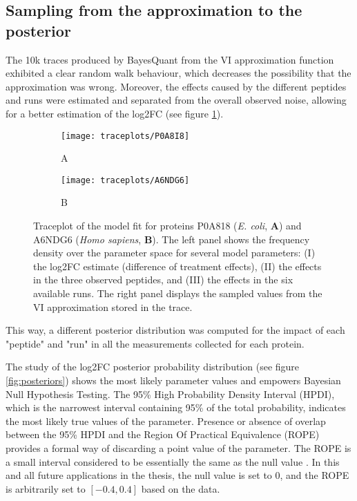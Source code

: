 \subsection{Sampling from the approximation to the posterior}
\label{subsec:basic_model}


The 10k traces produced by BayesQuant from the \ac{VI} approximation function exhibited a clear random walk behaviour, which decreases the possibility that the approximation was wrong. Moreover, the  effects caused by the different peptides and runs were estimated and separated from the overall observed noise, allowing for a better estimation of the \ac{log2FC} (see figure \ref{fig:traceplots}).

\begin{figure}[!h]
\begin{subfigure}{\textwidth}
\centering
\caption*{A}
\texttt{[image: traceplots/P0A8I8]}
\end{subfigure}
\bigskip
\begin{subfigure}{\textwidth}
\centering
\caption*{B}
\texttt{[image: traceplots/A6NDG6]}
\end{subfigure}
\caption[Traceplots for 2 proteins]{Traceplot of the model fit for proteins P0A818 (\textit{E. coli}, \textbf{A}) and A6NDG6 (\textit{Homo sapiens}, \textbf{B}). The left panel shows the frequency density over the parameter space for several model parameters: (I) the \ac{log2FC} estimate (difference of treatment effects), (II) the effects in the three observed peptides, and (III) the effects in the six available runs. The right panel displays the sampled values from the \ac{VI} approximation stored in the trace.}
\label{fig:traceplots}
\end{figure}

This way, a different posterior distribution was computed for the impact of each "peptide" and "run" in all the measurements collected for each protein.


The study of the \ac{log2FC} posterior probability distribution (see figure \ref{fig:posteriors}) shows the most likely parameter values and empowers Bayesian Null Hypothesis Testing. The 95\% High Probability Density Interval (\ac{HPDI}), which is the narrowest interval containing 95\% of the total probability, indicates the most likely true values of the parameter. Presence or absence of overlap between the 95\% \ac{HPDI} and the Region Of Practical Equivalence (\ac{ROPE}) provides a formal way of discarding a point value of the parameter. The \ac{ROPE} is a small interval considered to be essentially the same as the null value \cite{Kruschke}. In this and all future applications in the thesis, the null value is set to 0, and the \ac{ROPE} is arbitrarily set to $[-0.4, 0.4]$ based on the data.

